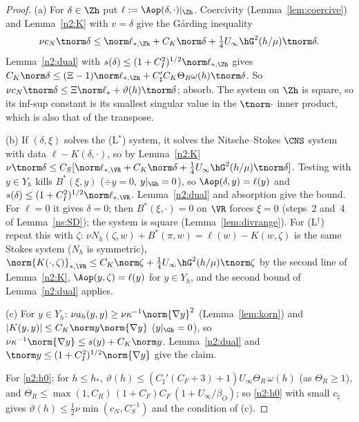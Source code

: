 \begin{proof}
(a) For $\delta\in\Zh$ put $\ell:=\Aop(\delta,\cdot)|_{\Zh}$. Coercivity (Lemma~\ref{lem:coercive}) and Lemma~\ref{n2:K} with $v=\delta$ give the G\aa rding inequality
\[
\nu c_N\tnorm\delta\le\norm\ell_{\ast,\Zh}+C_K\norm\delta+\tfrac14U_\infty\hG^2(h/\mu)\tnorm\delta .
\]
Lemma~\ref{n2:dual} with $s(\delta)\le(1+C_I^2)^{1/2}\norm\ell_{\ast,\Zh}$ gives $C_K\norm\delta\le(\Xi-1)\norm\ell_{\ast,\Zh}+C_\sharp'C_K\Theta_R\omega(h)\tnorm\delta$.
So $\nu c_N\tnorm\delta\le\Xi\norm\ell_{\ast}+\vartheta(h)\tnorm\delta$; absorb. The system on $\Zh$ is square, so its inf-sup constant is its smallest singular
value in the $\tnorm\cdot$ inner product, which is also that of the transpose.

(b) If $(\delta,\xi)$ solves the (L$^\ast$) system, it solves the Nitsche--Stokes $\CNS$ system with data $\ell-K(\delta,\cdot)$, so by Lemma~\ref{n2:K}
$\nu\tnorm\delta\le C_S[\norm\ell_{\ast,\VR}+C_K\norm\delta+\frac14U_\infty\hG^2(h/\mu)\tnorm\delta]$. Testing with $y\in Y_h$ kills $B^\ast(\xi,y)$
($\div y=0$, $y|_{\Gh}=0$), so $\Aop(\delta,y)=\ell(y)$ and $s(\delta)\le(1+C_I^2)^{1/2}\norm\ell_{\ast,\VR}$. Lemma~\ref{n2:dual} and absorption give the bound.
For $\ell=0$ it gives $\delta=0$; then $B^\ast(\xi,\cdot)=0$ on $\VR$ forces $\xi=0$ (steps~2 and~4 of Lemma~\ref{ns:SD}); the system is square
(Lemma~\ref{lem:divrange}). For (L$^\dagger$) repeat this with $\zeta$: $\nu N_h(\zeta,w)+B^\ast(\pi,w)=\ell(w)-K(w,\zeta)$ is the same Stokes system
($N_h$ is symmetric), $\norm{K(\cdot,\zeta)}_{\ast,\VR}\le C_K\norm\zeta+\frac14U_\infty\hG^2(h/\mu)\tnorm\zeta$ by the second line of Lemma~\ref{n2:K},
$\Aop(y,\zeta)=\ell(y)$ for $y\in Y_h$, and the second bound of Lemma~\ref{n2:dual} applies.

(c) For $y\in Y_h$: $\nu a_h(y,y)\ge\nu\kappa^{-1}\norm{\nabla y}^2$ (Lemma~\ref{lem:korn}) and $|K(y,y)|\le C_K\norm y\norm{\nabla y}$ ($y|_{\Gh}=0$), so
$\nu\kappa^{-1}\norm{\nabla y}\le s(y)+C_K\norm y$. Lemma~\ref{n2:dual} and $\tnorm y\le(1+C_I^2)^{1/2}\norm{\nabla y}$ give the claim.

For \eqref{n2:h0}: for $h\le h_\ast$, $\vartheta(h)\le(C_\sharp'(C_F+3)+1)U_\infty\Theta_R\,\omega(h)$ (as $\Theta_R\ge1$), and
$\Theta_R\le\max(1,C_R)\,(1+C_F)C_F\,(1+U_\infty/\beta_O)$; so \eqref{n2:h0} with small $c_\natural$ gives $\vartheta(h)\le\frac12\nu\min(c_N,C_S^{-1})$ and
the condition of (c).
\end{proof}

